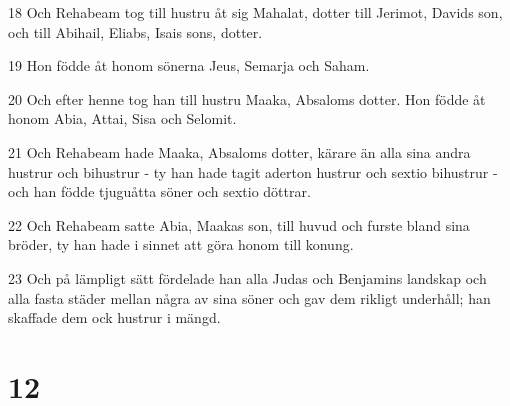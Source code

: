 \par 18 Och Rehabeam tog till hustru åt sig Mahalat, dotter till Jerimot, Davids son, och till Abihail, Eliabs, Isais sons, dotter.
\par 19 Hon födde åt honom sönerna Jeus, Semarja och Saham.
\par 20 Och efter henne tog han till hustru Maaka, Absaloms dotter. Hon födde åt honom Abia, Attai, Sisa och Selomit.
\par 21 Och Rehabeam hade Maaka, Absaloms dotter, kärare än alla sina andra hustrur och bihustrur - ty han hade tagit aderton hustrur och sextio bihustrur - och han födde tjuguåtta söner och sextio döttrar.
\par 22 Och Rehabeam satte Abia, Maakas son, till huvud och furste bland sina bröder, ty han hade i sinnet att göra honom till konung.
\par 23 Och på lämpligt sätt fördelade han alla Judas och Benjamins landskap och alla fasta städer mellan några av sina söner och gav dem rikligt underhåll; han skaffade dem ock hustrur i mängd.

\chapter{12}

